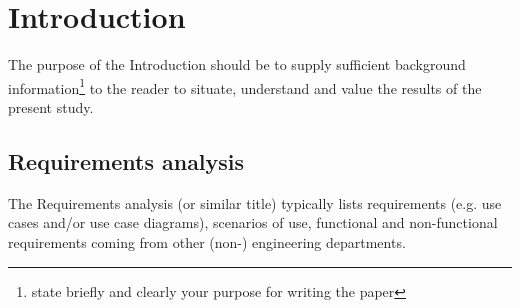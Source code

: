 \chapter{Introduction}

The purpose of the Introduction should be to supply sufficient background information\footnote{state briefly and clearly your purpose for writing the paper} to the reader to situate, understand and value the results of the present study.\par

\section{Requirements analysis}

The Requirements analysis (or similar title) typically lists requirements (e.g. use cases and/or use case diagrams), scenarios of use, functional and non-functional requirements coming from other (non-) engineering departments.\par

\lipsum[1-7]
 



